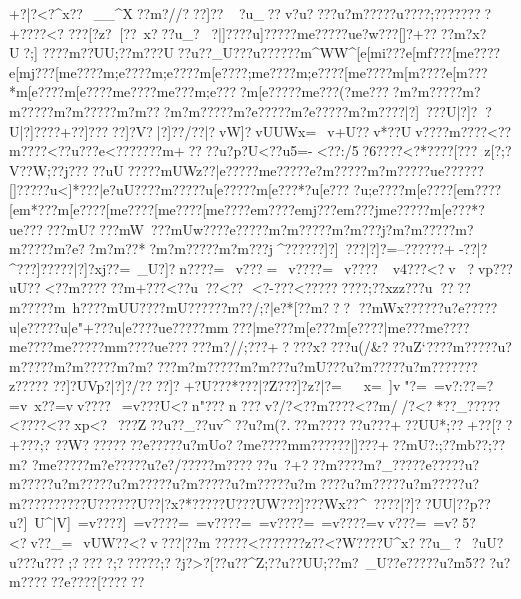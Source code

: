{{{{{{{{{{{{{{{{{{{{{{{{{{{{{{{{{{{{{{{{{{{{{{{{{{{{{{{{{{{{{{{{{{{{{{{{{{{{{{{{{{{{{{{{{{{{{{{{{{{{{{{{{{{{{{{{{{{{{{{{{{{{{{{{{{{{{{{{{{{{{{{{{{{{{{{{{{{{{{{{{{{{{{{{{{{{{{{{{{{{{{{{{{{{{{{{{{{{{{{{{{{{{{{{{{{{{{{{{{{{{{{{{{{{{{{{{{{{{{{{{{{{{{{{{{{{{{{{{{{{{{{{{{{{{{{{{{{{{{{{{{{{{{{{{{{{{{{{{{{{{{{{{{{{{{{{{{{{{{{{{{{{{{{{{{{{{{{{{{{{{{{{{{{{{{{{{{{{{{{{{{{{{{{{{{{{{{{{{{{{{{{{{{{{{{{{{{{{{{{{{{{{{{{{{{{{{{{{{{{{{{{{{{{{{{{{{{{{{{{{{{{{{{{{{{{{{{{{{{{{{{{{{{{{{{{{{{{{{{{{{{{{{{{{{{{{{{{{{{{{{{{{{{+?|?<?^x??\?~__^X??m?//???]?? 
~?u_??v?u????u?m ????}?u????;??}????{??+???{?<? 
??{?[?z?[??}~x???u_??|]????u{]?????m{e?????u{e?w???}[]?+????m?x?U?;]
???\??m??UU;??m???U??u??_U???u??????{m^WW^[e[mi???{e[mf???[m{e????{e[mj???[m{e????{m;e????{m;e????{m[e????;m{e????{m;e????[m{e????{m[m????{e[m???*{m[e????{m[e????{m{e????{m{e???m;e????m[e?????m{e???(?m{e????m?m?????m?m?????m?m?????m?m?? ?m?m?????m?e?????m?e?????m?m????|?]~???U|?]??U|?]????+??]??? ??]?V? |?]??/??|?vW\?]?vUUWx=~v+U??\?v*??U\?v???\??m????<??m????<??u???e<??????}?m+????u?p?U<??u5=-\?<??:/5\??6???{?<?*???{?[???~z[?;?V??W;??}j?????uU?????mUWz??}|e?????m{e?????e?m?????m?m?????u{e??????[]?????u<]*???|e?uU????m\e?????u[e?????m[e???*?u[e???
?u;e????{m[e????[e{m????[e{m*???{m[e????[m{e????[m{e????[m{e????{e{m????{e{mj???{e{m???j{m{e?????m[e???*?u{e??????mU????mW~??}?mUw???}?e?????m?m?????m?m???j?m?m?????m?m?????m?e?  ?m?m??*?m?m?????m?m???j^??????]?]~???|?]?=--??????+-??|?^? ??]?????|?]?xj?}?=~_U?]?n????=~v???=~v????=~v????~v4???<?v?\?vp??\??uU??<??m??????m+???<??u??\?<??		\?<?-??{?<?????\?????;??}xz{z???u????m????}?m~h???}?mUU???}?mU??????m??/;?|e?*  [??m?  {??
  {??mWx???\]???u?e?????u|e?????u|e"+???u|e????u{e?????m{m???|m{e???m[e???m[e????|m{e???m{e????{m{e????{m{e?????m{m????u{e??????m?//;??}?+???}?x????u(/&???uZ`???}?m?????u?m?????m?m?????m?m????m?m?????m?m???u?mU}???u?m?????u?m??????}?z?  ??}??
 ??]?UVp?|?]?/????]?+?U??}?  *???|?Z???]?z? |?=~~x=~]v "?=~=v?:??=?=v~x??=vv????~=v???U<?n"???\?n
???\?v?/?<??m????<??m//?\?<?*??\?_?????<???{?<??xp<?~???Z??u??\_?}?uv^??u?m(?.?}?m??????u???+??}UU}*;??}+??[??
+??{?;?
??W{????????e?????u?mUo??m{e??? ?m{m??????|]???+??mU?: ;??m}b??;??m?%
?m{e?????m?e?????u?e?/?????m??????u~?+???m???}?m?_?????e?????u?m?????u?m?????u?m?????u?m?????u?m?????u?m????u?m?????u?m?????u?m??????????U??????U??|?x? *}??? ??U??}?UW? ??]???Wx??^~????|?]??UU|?}?p??u}?]~U^|V]~=v????]~=v????=~=v????=~=v????=~=v????=vv??? =~=v?5?<?v??_=~vUW??<?v???|??m
?????<???????\?z?{?<?W???\??}U^x???u_?~?uU?u??}?u???;?????;??????;??j?>?[??u??^Z;??u??UU;??m?~_U?}?e?????u?m5???u?m??????e????[???}???}
}}}}}}}}}}}}}}}}}}}}}}}}}}}}}}}}}}}}}}}}}}}}}}}}}}}}}}}}}}}}}}}}}}}}}}}}}}}}}}}}}}}}}}}}}}}}}}}}}}}}}}}}}}}}}}}}}}}}}}}}}}}}}}}}}}}}}}}}}}}}}}}}}}}}}}}}}}}}}}}}}}}}}}}}}}}}}}}}}}}}}}}}}}}}}}}}}}}}}}}}}}}}}}}}}}}}}}}}}}}}}}}}}}}}}}}}}}}}}}}}}}}}}}}}}}}}}}}}}}}}}}}}}}}}}}}}}}}}}}}}}}}}}}}}}}}}}}}}}}}}}}}}}}}}}}}}}}}}}}}}}}}}}}}}}}}}}}}}}}}}}}}}}}}}}}}}}}}}}}}}}}}}}}}}}}}}}}}}}}}}}}}}}}}}}}}}}}}}}}}}}}}}}}}}}}}}}}}}}}}}}}}}}}}}}}}}}}}}}}}}}}}}}}}}}}}}}}}}}}}}}}}}}}}}}}}}}}}}}}}}}}}}}}}}}}}}}}}}}}}}}}}}}}}}}}}}}}}}}}}}}}}}}}}}}}}}}}}}}}
